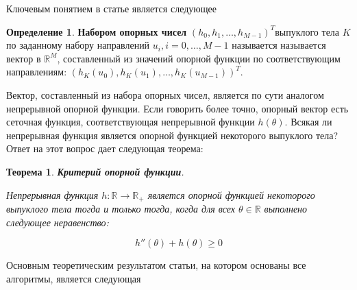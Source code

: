 \documentclass[a4paper, 12pt, titlepage]{article}
\theoremstyle{definition}
\newtheorem{SmartDefinition}{Определение}
\theoremstyle{plain}
\newtheorem{SmartTheorem}{Теорема}
\begin{document}
Ключевым понятием в статье является следующее

\begin{SmartDefinition}
 \label{def:support-vector}
 \textbf{Набором опорных чисел}
 $(h_{0}, h_{1}, \ldots, h_{M - 1})^{T}$выпуклого тела $K$ по заданному набору
 направлений $u_{i}, i = 0, \ldots, M - 1$ называется называется вектор в
 $\mathbb{R}^{M}$, составленный из значений опорной функции по соответствующим
 направлениям: $(h_{K}(u_{0}), h_{K}(u_{1}), \ldots, h_{K}(u_{M - 1}))^{T}$.
\end{SmartDefinition}

Вектор, составленный из набора опорных чисел, является по сути аналогом
непрерывной опорной функции. Если говорить более точно, опорный вектор есть
сеточная функция, соответствующая непрерывной функции $h(\theta)$. Всякая ли
непрерывная функция является опорной функцией некоторого выпуклого тела? Ответ
на этот вопрос дает следующая теорема:

\begin{SmartTheorem}
 \label{thm:support-function-criterion}
 \textbf{Критерий опорной функции}.

 Непрерывная функция $h : \mathbb{R} \to \mathbb{R}_{+}$ является опорной
 функцией некоторого выпуклого тела тогда и только тогда, когда для всех
 $\theta \in \mathbb{R}$ выполнено следующее неравенство:

 \begin{equation}
 h''(\theta) + h(\theta) \geq 0
 \end{equation}
\end{SmartTheorem}


Основным теоретическим результатом статьи, на котором основаны все алгоритмы,
является следующая
\end{document}
